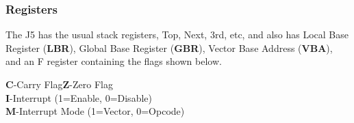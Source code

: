\subsubsection{Registers}
The J5 has the usual stack registers, Top, Next, 3rd, etc, and also has Local
Base Register (\textbf{LBR}), Global Base Register (\textbf{GBR}), Vector Base
Address (\textbf{VBA}), and an F register containing the flags shown below.

\vspace{10mm}

\noindent\begin{minipage}[b]{0.5\linewidth}
\end{minipage}%
\noindent\begin{minipage}[b]{0.5\linewidth}
  \textbf{C}-Carry Flag\@ \textbf{Z}-Zero Flag\\
  \textbf{I}-Interrupt (1=Enable, 0=Disable)\\
  \textbf{M}-Interrupt Mode (1=Vector, 0=Opcode)
\end{minipage}

